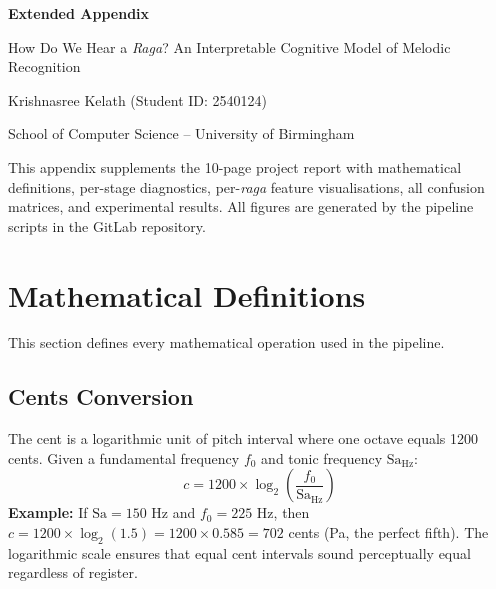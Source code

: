 \documentclass[11pt,a4paper]{article}
\begin{document}
\setcounter{table}{3}
\setcounter{figure}{4}

\begin{center}
{\LARGE\bfseries Extended Appendix\par}
\vspace{0.3cm}
{\Large How Do We Hear a \textit{Raga}? An Interpretable Cognitive Model of Melodic Recognition\par}
\vspace{0.2cm}
{\large Krishnasree Kelath \quad (Student ID: 2540124)\par}
{\large School of Computer Science -- University of Birmingham\par}
\vspace{0.2cm}
{\normalsize This appendix supplements the 10-page project report with mathematical definitions, per-stage diagnostics, per-\textit{raga} feature visualisations, all confusion matrices, and experimental results. All figures are generated by the pipeline scripts in the GitLab repository.\par}
\end{center}

\vspace{0.3cm}
\tableofcontents

\appendix

\section{Mathematical Definitions}

This section defines every mathematical operation used in the pipeline.

\subsection{Cents Conversion}

The cent is a logarithmic unit of pitch interval where one octave equals 1200 cents. Given a fundamental frequency $f_0$ and tonic frequency $\text{Sa}_{\text{Hz}}$:
\[
c = 1200 \times \log_2\!\left(\frac{f_0}{\text{Sa}_{\text{Hz}}}\right)
\]
\textbf{Example:} If $\text{Sa} = 150$ Hz and $f_0 = 225$ Hz, then $c = 1200 \times \log_2(1.5) = 1200 \times 0.585 = 702$ cents (Pa, the perfect fifth). The logarithmic scale ensures that equal cent intervals sound perceptually equal regardless of register.
\end{document}
